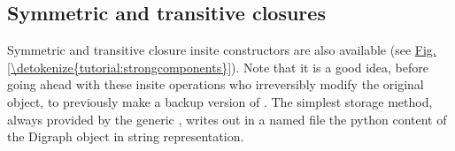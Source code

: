 \documentclass[a4paper,10pt,english]{sphinxhowto}
\begin{document}
\begin{sphinxVerbatim}[commandchars=\\\{\},numbers=left,firstnumber=1,stepnumber=1]
\end{sphinxVerbatim}


\subsection{Symmetric and transitive closures}
\label{\detokenize{tutorial:symmetric-and-transitive-closures}}
Symmetric and transitive closure in\sphinxhyphen{}site constructors are also available (see \hyperref[\detokenize{tutorial:strongcomponents}]{Fig.\@ \ref{\detokenize{tutorial:strongcomponents}}}). Note that it is a good idea, before going ahead with these in\sphinxhyphen{}site operations who irreversibly modify the original  object, to previously make a backup version of . The simplest storage method, always provided by the generic , writes out in a named file the python content of the Digraph object in string representation.
\end{document}
